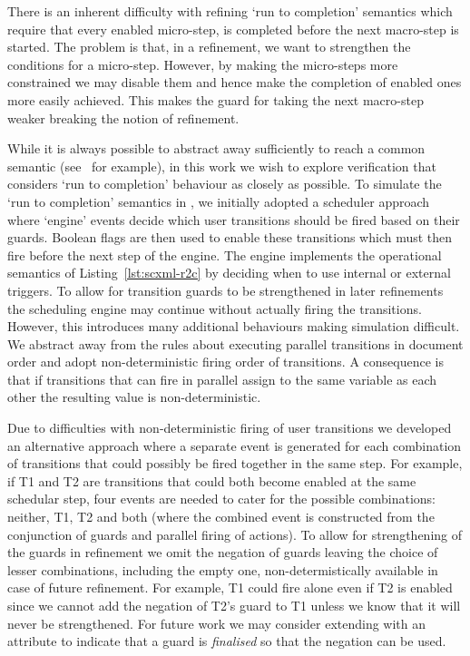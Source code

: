 There is an inherent difficulty with refining `run to completion' semantics which require that every enabled micro-step, is completed before the next macro-step is started. The problem is that, in a refinement, we want to strengthen the conditions for a micro-step. However, by making the micro-steps more constrained we may disable them and hence make the completion of enabled ones more easily achieved. This makes the guard for taking the next macro-step weaker breaking the notion of refinement.

While it is always possible to abstract away sufficiently to reach a common semantic (see~\cite{Snook12:FMCO} for example), in this work we wish to explore verification that considers `run to completion' behaviour as closely as possible.    
To simulate the `run to completion' semantics in \EventB, we initially adopted a scheduler approach where `engine' events decide which user transitions should be fired based on their guards. 
Boolean flags are then used to enable these transitions which must then fire before the next step of the engine.
The engine implements the operational semantics of Listing~\ref{lst:scxml-r2c} by deciding when to use internal or external triggers.
To allow for transition guards to be strengthened in later refinements the scheduling engine may continue without actually firing the transitions.
However, this introduces many additional behaviours making simulation difficult.
We abstract away from the \SCXML rules about executing parallel transitions in document order and adopt non-deterministic firing order of transitions. 
A consequence is that if transitions that can fire in parallel assign to the same variable as each other the resulting value is non-deterministic.

Due to difficulties with non-deterministic firing of user transitions we developed an alternative approach where a separate event is generated for each combination of transitions that could possibly be fired together in the same step. 
For example, if T1 and T2 are transitions that could both become enabled at the same schedular step, four events are needed to cater for the possible combinations: neither, T1, T2 and both (where the combined event is constructed from the conjunction of guards and parallel firing of actions). 
To allow for strengthening of the guards  in refinement we omit the negation of guards
leaving the choice of lesser combinations, including the empty one, non-determistically available in case of future refinement.
For example, T1 could fire alone even if T2 is enabled since we cannot add the negation of T2's guard to T1 unless we know that it will never be strengthened. 
For future work we may consider extending \SCXML with an attribute to indicate that a guard is \emph{finalised} so that the negation can be used.

